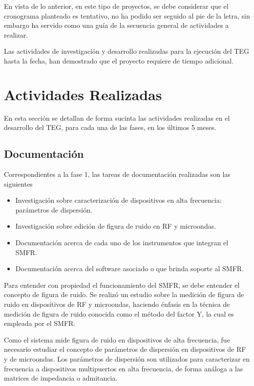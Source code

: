\documentclass[paper=letter,oneside,fontsize=12pt, parskip=full]{article}
\begin{document}
	En vista de lo anterior, en este tipo de proyectos, se debe considerar que el cronograma planteado es tentativo, no ha podido ser seguido al pie de la letra, sin embargo ha servido como una guía de la secuencia general de actividades a realizar.

	Las actividades de investigación y desarrollo realizadas para la ejecución del TEG hasta la fecha, han demostrado que el proyecto requiere de tiempo adicional.	

	\section{Actividades Realizadas}
	
	En esta sección se detallan de forma sucinta las actividades realizadas en el desarrollo del TEG, para cada una de las fases, en los últimos 5 meses.
	
	\subsection{Documentación}
	
	Correspondientes a la  fase 1, las tareas de documentación realizadas son las siguientes
	
	\begin{itemize}
		\item Investigación sobre caracterización de dispositivos en alta frecuencia: parámetros de dispersión.
		\item Investigación sobre edición de figura de ruido en RF y microondas.
		\item Documentación acerca de cada uno de los instrumentos que integran el SMFR.
		\item Documentación acerca del software asociado o que brinda soporte al SMFR.				
	\end{itemize}	
	
	Para entender con propiedad el funcionamiento del SMFR, se debe entender el concepto de figura de ruido. Se realizó un estudio sobre la medición de figura de ruido en dispositivos de RF y microondas, haciendo énfasis en la técnica de medición de figura de ruido conocida como el método del factor Y, la cual es empleada por el SMFR.
	
	Como el sistema mide figura de ruido en dispositivos de alta frecuencia, fue necesario estudiar el concepto de parámetros de dispersión en dispositivos de RF y de microondas. Los parámetros de dispersión son utilizados para caracterizar en frecuencia a dispositivos multipuertos en alta frecuencia, de forma análoga a las matrices de impedancia o admitancia.
	
\end{document}
